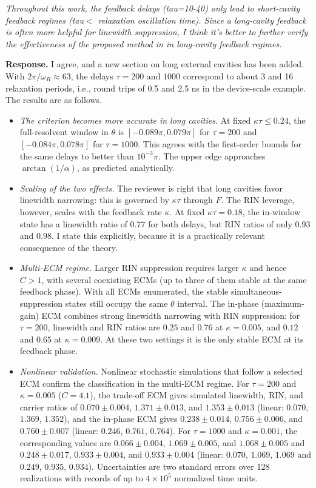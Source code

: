 \documentclass[11pt]{article}
\newenvironment{comment}{\par\medskip\noindent\begin{minipage}{\linewidth}\color{rc}\itshape}{\end{minipage}\par\smallskip}
\newcommand{\resp}{\noindent\textbf{Response.} }
\begin{document}
\begin{comment}Throughout this work, the feedback delays (tau=10-40) only lead to short-cavity feedback regimes (tau$<$ relaxation oscillation time). Since a long-cavity feedback is often more helpful for linewidth suppression, I think it's better to further verify the effectiveness of the proposed method in in long-cavity feedback regimes.\end{comment}
\resp I agree, and a new section on long external cavities has been added. With $2\pi/\omega_R\approx63$, the delays $\tau=200$ and $1000$ correspond to about 3 and 16 relaxation periods, i.e., round trips of 0.5 and 2.5 ns in the device-scale example. The results are as follows.
\begin{itemize}
\item \emph{The criterion becomes more accurate in long cavities.} At fixed $\kappa\tau\le0.24$, the full-resolvent window in $\theta$ is $[-0.089\pi,0.079\pi]$ for $\tau=200$ and $[-0.084\pi,0.078\pi]$ for $\tau=1000$. This agrees with the first-order bounds for the same delays to better than $10^{-3}\pi$. The upper edge approaches $\arctan(1/\alpha)$, as predicted analytically.
\item \emph{Scaling of the two effects.} The reviewer is right that long cavities favor linewidth narrowing: this is governed by $\kappa\tau$ through $F$. The RIN leverage, however, scales with the feedback rate $\kappa$. At fixed $\kappa\tau=0.18$, the in-window state has a linewidth ratio of $0.77$ for both delays, but RIN ratios of only $0.93$ and $0.98$. I state this explicitly, because it is a practically relevant consequence of the theory.
\item \emph{Multi-ECM regime.} Larger RIN suppression requires larger $\kappa$ and hence $C>1$, with several coexisting ECMs (up to three of them stable at the same feedback phase). With all ECMs enumerated, the stable simultaneous-suppression states still occupy the same $\theta$ interval. The in-phase (maximum-gain) ECM combines strong linewidth narrowing with RIN suppression: for $\tau=200$, linewidth and RIN ratios are $0.25$ and $0.76$ at $\kappa=0.005$, and $0.12$ and $0.65$ at $\kappa=0.009$. At these two settings it is the only stable ECM at its feedback phase.
\item \emph{Nonlinear validation.} Nonlinear stochastic simulations that follow a selected ECM confirm the classification in the multi-ECM regime. For $\tau=200$ and $\kappa=0.005$ ($C=4.1$), the trade-off ECM gives simulated linewidth, RIN, and carrier ratios of $0.070\pm0.004$, $1.371\pm0.013$, and $1.353\pm0.013$ (linear: $0.070$, $1.369$, $1.352$), and the in-phase ECM gives $0.238\pm0.014$, $0.756\pm0.006$, and $0.760\pm0.007$ (linear: $0.246$, $0.761$, $0.764$). For $\tau=1000$ and $\kappa=0.001$, the corresponding values are $0.066\pm0.004$, $1.069\pm0.005$, and $1.068\pm0.005$ and $0.248\pm0.017$, $0.933\pm0.004$, and $0.933\pm0.004$ (linear: $0.070$, $1.069$, $1.069$ and $0.249$, $0.935$, $0.934$). Uncertainties are two standard errors over 128 realizations with records of up to $4\times10^{5}$ normalized time units.
\end{itemize}
\end{document}
